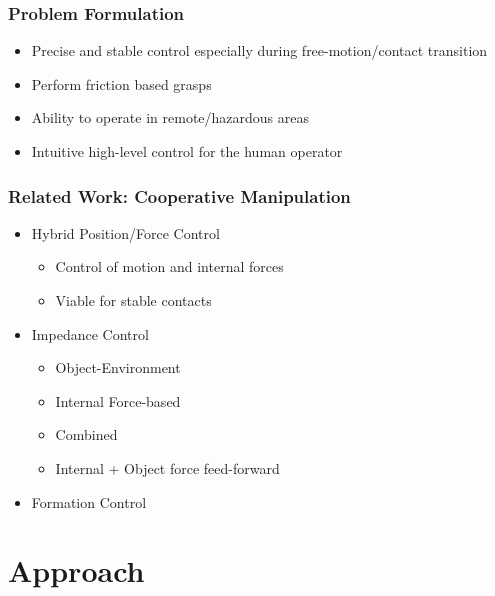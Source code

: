 \documentclass[student]{ITRslides}
\begin{document}
\begin{frame}
	\frametitle{Problem Formulation}

	\begin{itemize}
		\item Precise and stable control especially during free-motion/contact transition
		\item Perform friction based grasps
		\item Ability to operate in remote/hazardous areas
		\item Intuitive high-level control for the human operator
	\end{itemize}

\end{frame}

\begin{frame}
	\frametitle{Related Work: Cooperative Manipulation}
	\begin{itemize}
		\item Hybrid Position/Force Control  \cite{Hsu_93}
		\begin{itemize}
			\item Control of motion and internal forces
			\item Viable for stable contacts
		\end{itemize}
		\item Impedance Control
		\begin{itemize}
			\item Object-Environment \cite{Schneider_92}
			\item Internal Force-based\cite{Bonitz_96}
			\item Combined \cite{Caccavale_01,Caccavale_08}
			\item Internal + Object force feed-forward \cite{DePascali_15}
		\end{itemize}
		\item Formation Control \cite{Sieber_15}
	\end{itemize}
\end{frame}

\section{Approach}
\end{document}
